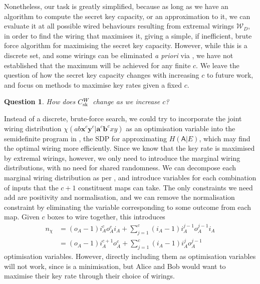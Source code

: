 \documentclass[10pt, a4paper]{article}
\numberwithin{equation}{section} %
\theoremstyle{definition}
\theoremstyle{plain}
\newtheorem{question}{Question}
\newcommand{\?}{\mathrel{?}} %
\newcommand{\cvec}[1]{\boldsymbol{\mathbf{#1}}}    %
\newcommand{\sW}{\mathcal{W}}
\newcommand{\crv}[1]{\mathsf{#1}}
\newcommand{\sk}{\rm sk}
\begin{document}
                  Nonetheless, our task is greatly simplified, because as long as we have an algorithm to compute the secret key capacity, or an approximation to it, we can evaluate it at all possible wired behaviours resulting from extremal wirings \(\sW_D\), in order to find the wiring that maximises it, giving a simple, if inefficient, brute force algorithm for maximising the secret key capacity. However, while this is a discrete set, and some wirings can be eliminated \emph{a priori} via , we have not established that the maximum will be achieved for any finite \(c\). We leave the question of how the secret key capacity changes with increasing \(c\) to future work, and focus on methods to maximise key rates given a fixed \(c\).
                  \begin{question}
                    How does \(C_{\sk}^W\) change as we increase \(c\)?
                  \end{question}

                  Instead of a discrete, brute-force search, we could try to incorporate the joint wiring distribution \(\chi(ab\cvec{x}^c\cvec{y}^c|\cvec{a}^c\cvec{b}^cxy)\) as an optimisation variable into the semidefinite program in , the SDP for approximating \(H(\crv{A}|E)\), which may find the optimal wiring more efficiently. Since we know that the key rate is maximised by extremal wirings, however, we only need to introduce the marginal wiring distributions, with no need for shared randomness. We can decompose each marginal wiring distribution as per , and introduce variables for each combination of inputs that the \(c+1\) constituent maps can take. The only constraints we need add are positivity and normalisation, and we can remove the normalisation constraint by eliminating the variable corresponding to some outcome from each map. Given \(c\) boxes to wire together, this introduces
                  \begin{align}
                    n_{\chi} &= (o_A - 1) i_A^c o_A^c i_A + \sum_{j=1}^c (i_A-1) i_A^{j-1} o_A^{j-1} i_A \\
                             &= (o_A - 1) i_A^{c+1} o_A^c + \sum_{j=1}^c (i_A-1) i_A^{j} o_A^{j-1}
                  \end{align}
                  optimisation variables. However, directly including them as optimisation variables will not work, since  is a minimisation, but Alice and Bob would want to maximise their key rate through their choice of wirings.
\end{document}
